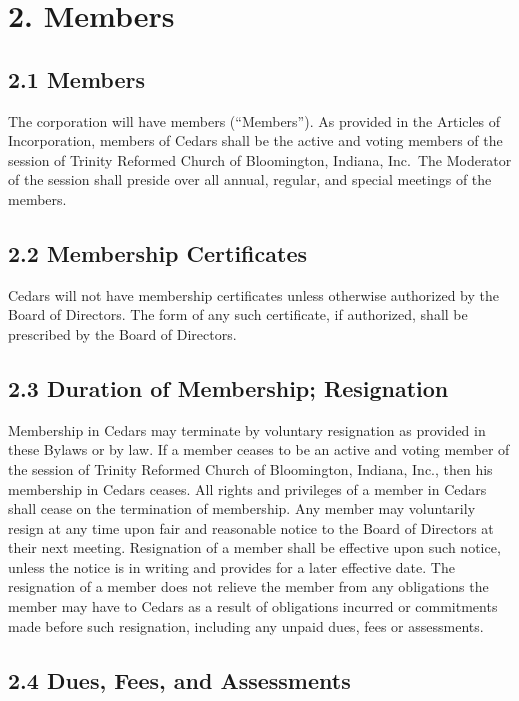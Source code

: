 \documentclass[
]{book}
\begin{document}
\section{2. Members}\label{members}

\subsection{2.1 Members}\label{members-1}

The corporation will have members (``Members''). As provided in the Articles of Incorporation, members of Cedars shall be the active and voting members of the session of Trinity Reformed Church of Bloomington, Indiana, Inc.~The Moderator of the session shall preside over all annual, regular, and special meetings of the members.

\subsection{2.2 Membership Certificates}\label{membership-certificates}

Cedars will not have membership certificates unless otherwise authorized by the Board of Directors. The form of any such certificate, if authorized, shall be prescribed by the Board of Directors.

\subsection{2.3 Duration of Membership; Resignation}\label{duration-of-membership-resignation}

Membership in Cedars may terminate by voluntary resignation as provided in these Bylaws or by law. If a member ceases to be an active and voting member of the session of Trinity Reformed Church of Bloomington, Indiana, Inc., then his membership in Cedars ceases. All rights and privileges of a member in Cedars shall cease on the termination of membership. Any member may voluntarily resign at any time upon fair and reasonable notice to the Board of Directors at their next meeting. Resignation of a member shall be effective upon such notice, unless the notice is in writing and provides for a later effective date. The resignation of a member does not relieve the member from any obligations the member may have to Cedars as a result of obligations incurred or commitments made before such resignation, including any unpaid dues, fees or assessments.

\subsection{2.4 Dues, Fees, and Assessments}\label{dues-fees-and-assessments}
\end{document}
